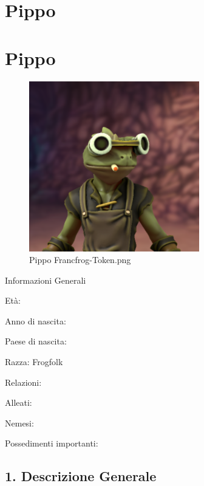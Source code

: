 \section{Pippo}
\section{Pippo}


\begin{figure}
\centering
\includegraphics{Pippo_Francfrog-Token.png}
\caption{Pippo Francfrog-Token.png}
\end{figure}

Informazioni Generali

Età:

Anno di nascita:

Paese di nascita:

Razza: Frogfolk

Relazioni:

Alleati:

Nemesi:

Possedimenti importanti:


\subsection{1. Descrizione Generale}\label{descrizione-generale}


